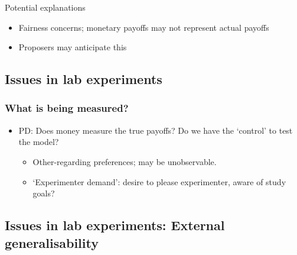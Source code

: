 \documentclass[]{article}
\providecommand{\tightlist}{%
  \setlength{\itemsep}{0pt}\setlength{\parskip}{0pt}}
\begin{document}
Potential explanations

\begin{itemize}
\tightlist
\item
  Fairness concerns; monetary payoffs may not represent actual payoffs
\item
  Proposers may anticipate this
\end{itemize}

\hypertarget{issues-in-lab-experiments}{%
\subsection{Issues in lab experiments}\label{issues-in-lab-experiments}}

\hypertarget{what-is-being-measured}{%
\subsubsection{What is being measured?}\label{what-is-being-measured}}

\begin{itemize}
\tightlist
\item
  PD: Does money measure the true payoffs? Do we have the `control' to test the model?

  \begin{itemize}
  \tightlist
  \item
    Other-regarding preferences; may be unobservable.
  \item
    `Experimenter demand': desire to please experimenter, aware of study goals?
  \end{itemize}
\end{itemize}

\hypertarget{issues-in-lab-experiments-external-generalisability}{%
\subsection{Issues in lab experiments: External generalisability}\label{issues-in-lab-experiments-external-generalisability}}
\end{document}
